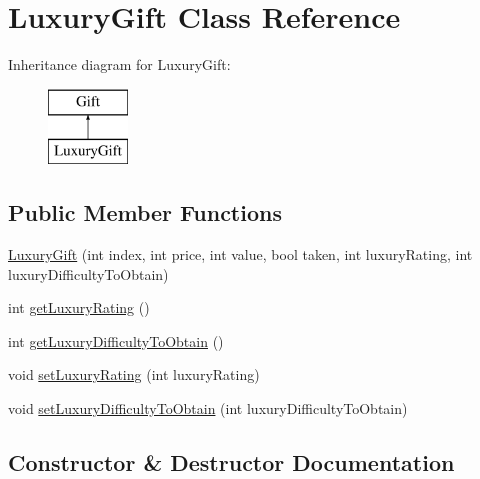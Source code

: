 \hypertarget{class_luxury_gift}{}\section{Luxury\+Gift Class Reference}
\label{class_luxury_gift}
Inheritance diagram for Luxury\+Gift\+:\begin{figure}[H]
\begin{center}
\leavevmode
\includegraphics[height=2.000000cm]{class_luxury_gift}
\end{center}
\end{figure}
\subsection*{Public Member Functions}
\begin{DoxyCompactItemize}
\item 
\hyperlink{class_luxury_gift_ac4a20f9cde3d296abbaf2cda06318ff0}{Luxury\+Gift} (int index, int price, int value, bool taken, int luxury\+Rating, int luxury\+Difficulty\+To\+Obtain)
\item 
int \hyperlink{class_luxury_gift_a7f1f89000bc9a5c2c88d525dc8f7f3c2}{get\+Luxury\+Rating} ()
\item 
int \hyperlink{class_luxury_gift_a6441f2a7863c9079ce153721d3b6bce6}{get\+Luxury\+Difficulty\+To\+Obtain} ()
\item 
void \hyperlink{class_luxury_gift_a3a2f57732502c45b2e5bcab6963d4de7}{set\+Luxury\+Rating} (int luxury\+Rating)
\item 
void \hyperlink{class_luxury_gift_ab7897f54cd7a896dad198107e92fb8ca}{set\+Luxury\+Difficulty\+To\+Obtain} (int luxury\+Difficulty\+To\+Obtain)
\end{DoxyCompactItemize}


\subsection{Constructor \& Destructor Documentation}
\mbox{\label{class_luxury_gift_ac4a20f9cde3d296abbaf2cda06318ff0}} 

